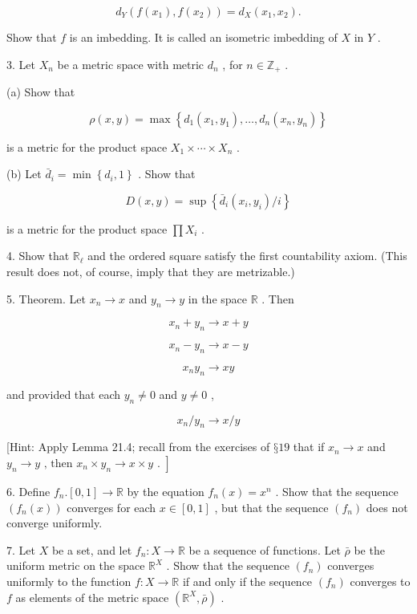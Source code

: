 \[
{d}_{Y}\left( {f\left( {x}_{1}\right) ,f\left( {x}_{2}\right) }\right)  = {d}_{X}\left( {{x}_{1},{x}_{2}}\right) .
\]

Show that \(f\) is an imbedding. It is called an isometric imbedding of \(X\) in \(Y\) .

3. Let \({X}_{n}\) be a metric space with metric \({d}_{n}\) , for \(n \in  {\mathbb{Z}}_{ + }\) .

(a) Show that

\[
\rho \left( {x,y}\right)  = \max \left\{  {{d}_{1}\left( {{x}_{1},{y}_{1}}\right) ,\ldots ,{d}_{n}\left( {{x}_{n},{y}_{n}}\right) }\right\}
\]

is a metric for the product space \({X}_{1} \times  \cdots  \times  {X}_{n}\) .

(b) Let \({\bar{d}}_{i} = \min \left\{  {{d}_{i},1}\right\}\) . Show that

\[
D\left( {x,y}\right)  = \sup \left\{  {{\bar{d}}_{i}\left( {{x}_{i},{y}_{i}}\right) /i}\right\}
\]

is a metric for the product space \(\prod {X}_{i}\) .

4. Show that \({\mathbb{R}}_{\ell }\) and the ordered square satisfy the first countability axiom. (This result does not, of course, imply that they are metrizable.)

5. Theorem. Let \({x}_{n} \rightarrow  x\) and \({y}_{n} \rightarrow  y\) in the space \(\mathbb{R}\) . Then

\[
{x}_{n} + {y}_{n} \rightarrow  x + y
\]

\[
{x}_{n} - {y}_{n} \rightarrow  x - y
\]

\[
{x}_{n}{y}_{n} \rightarrow  {xy}
\]

and provided that each \({y}_{n} \neq  0\) and \(y \neq  0\) ,

\[
{x}_{n}/{y}_{n} \rightarrow  x/y
\]

[Hint: Apply Lemma 21.4; recall from the exercises of \(§{19}\) that if \({x}_{n} \rightarrow  x\) and \(\left. {{y}_{n} \rightarrow  y\text{ , then }{x}_{n} \times  {y}_{n} \rightarrow  x \times  y\text{ . }}\right\rbrack\)

6. Define \({f}_{n}.\left\lbrack  {0,1}\right\rbrack   \rightarrow  \mathbb{R}\) by the equation \({f}_{n}\left( x\right)  = {x}^{n}\) . Show that the sequence \(\left( {{f}_{n}\left( x\right) }\right)\) converges for each \(x \in  \left\lbrack  {0,1}\right\rbrack\) , but that the sequence \(\left( {f}_{n}\right)\) does not converge uniformly.

7. Let \(X\) be a set, and let \({f}_{n} : X \rightarrow  \mathbb{R}\) be a sequence of functions. Let \(\bar{\rho }\) be the uniform metric on the space \({\mathbb{R}}^{X}\) . Show that the sequence \(\left( {f}_{n}\right)\) converges uniformly to the function \(f : X \rightarrow  \mathbb{R}\) if and only if the sequence \(\left( {f}_{n}\right)\) converges to \(f\) as elements of the metric space \(\left( {{\mathbb{R}}^{X},\bar{\rho }}\right)\) .

